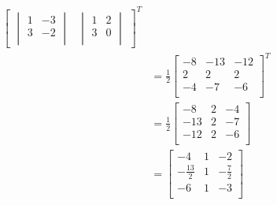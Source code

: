 \documentclass[11pt]{article}
\begin{document}
\begin{align*}
\begin{bmatrix}
\begin{vmatrix}
                               1 & -3 \\
                               3 & -2\\
                             \end{vmatrix}
                          &\begin{vmatrix}
                             1 & 2\\
                             3 & 0\\
                           \end{vmatrix}
                        \end{bmatrix}^{T}
  \\
         &=\frac{1}{2}
           \begin{bmatrix}
             -8 & -13 & -12\\
             2 & 2 & 2\\
             -4 & -7 & -6\\
           \end{bmatrix}^{T}
\\
         &=\frac{1}{2}
           \begin{bmatrix}
             -8 &  2 & -4\\
             -13 & 2 & -7\\
             -12 & 2 & -6\\
           \end{bmatrix}
  \\
         &= \begin{bmatrix}
              -4 & 1 & -2\\
              -\frac{13}{2} & 1 & - \frac{7}{2}\\
              -6 & 1 & -3\\
            \end{bmatrix}
\end{align*}
\end{document}
